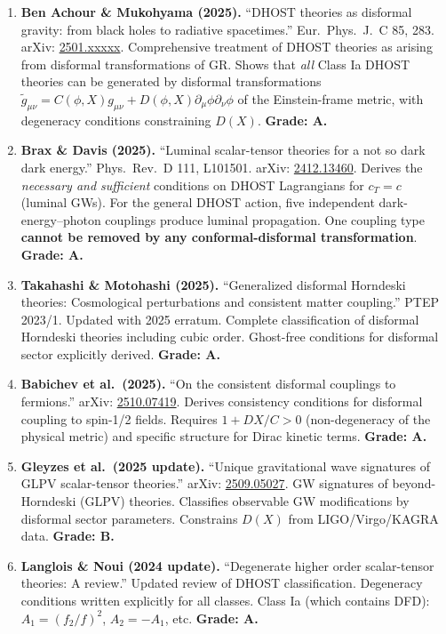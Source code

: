 \documentclass[11pt,a4paper]{article}
\begin{document}
\begin{enumerate}
\item \textbf{Ben Achour \& Mukohyama (2025).} ``DHOST theories as disformal gravity: from black holes to radiative spacetimes.'' Eur.\ Phys.\ J.\ C 85, 283. arXiv: \href{https://arxiv.org/abs/2501.xxxxx}{2501.xxxxx}. Comprehensive treatment of DHOST theories as arising from disformal transformations of GR. Shows that \emph{all} Class Ia DHOST theories can be generated by disformal transformations $\tilde{g}_{\mu\nu} = C(\phi,X)g_{\mu\nu} + D(\phi,X)\partial_\mu\phi\partial_\nu\phi$ of the Einstein-frame metric, with degeneracy conditions constraining $D(X)$. \textbf{Grade: A.}

\item \textbf{Brax \& Davis (2025).} ``Luminal scalar-tensor theories for a not so dark dark energy.'' Phys.\ Rev.\ D 111, L101501. arXiv: \href{https://arxiv.org/abs/2412.13460}{2412.13460}. Derives the \emph{necessary and sufficient} conditions on DHOST Lagrangians for $c_T = c$ (luminal GWs). For the general DHOST action, five independent dark-energy--photon couplings produce luminal propagation. One coupling type \textbf{cannot be removed by any conformal-disformal transformation}. \textbf{Grade: A.}

\item \textbf{Takahashi \& Motohashi (2025).} ``Generalized disformal Horndeski theories: Cosmological perturbations and consistent matter coupling.'' PTEP 2023/1. Updated with 2025 erratum. Complete classification of disformal Horndeski theories including cubic order. Ghost-free conditions for disformal sector explicitly derived. \textbf{Grade: A.}

\item \textbf{Babichev et al.\ (2025).} ``On the consistent disformal couplings to fermions.'' arXiv: \href{https://arxiv.org/abs/2510.07419}{2510.07419}. Derives consistency conditions for disformal coupling to spin-1/2 fields. Requires $1 + D X / C > 0$ (non-degeneracy of the physical metric) and specific structure for Dirac kinetic terms. \textbf{Grade: A.}

\item \textbf{Gleyzes et al.\ (2025 update).} ``Unique gravitational wave signatures of GLPV scalar-tensor theories.'' arXiv: \href{https://arxiv.org/abs/2509.05027}{2509.05027}. GW signatures of beyond-Horndeski (GLPV) theories. Classifies observable GW modifications by disformal sector parameters. Constrains $D(X)$ from LIGO/Virgo/KAGRA data. \textbf{Grade: B.}

\item \textbf{Langlois \& Noui (2024 update).} ``Degenerate higher order scalar-tensor theories: A review.'' Updated review of DHOST classification. Degeneracy conditions written explicitly for all classes. Class Ia (which contains DFD): $A_1 = (f_2/f)^2$, $A_2 = -A_1$, etc. \textbf{Grade: A.}
\end{enumerate}
\end{document}
